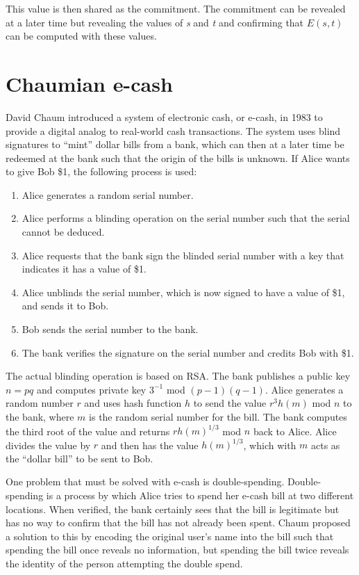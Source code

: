 \documentclass[11pt]{article}
\begin{document}
This value is then shared as the commitment. The commitment can be revealed at a later time but revealing the values of
\emph{s} and \emph{t} and confirming that $E(s,t)$ can be computed with these values.

\section{Chaumian e-cash}
David Chaum introduced a system of electronic cash, or e-cash, in 1983 to provide a digital analog to real-world cash
transactions. The system uses blind signatures to ``mint'' dollar bills from a bank, which can then at a later time be
redeemed at the bank such that the origin of the bills is unknown.\cite{chaum83} If Alice wants to give Bob \$1, the
following process is used:
\begin{enumerate}
    \item Alice generates a random serial number.
    \item Alice performs a blinding operation on the serial number such that the serial cannot be deduced.
    \item Alice requests that the bank sign the blinded serial number with a key that indicates it has a value of \$1.
    \item Alice unblinds the serial number, which is now signed to have a value of \$1, and sends it to Bob.
    \item Bob sends the serial number to the bank.
    \item The bank verifies the signature on the serial number and credits Bob with \$1.
\end{enumerate}

The actual blinding operation is based on RSA. The bank publishes a public key $n=pq$ and computes private key
$3^{-1}$ mod $(p-1)(q-1)$. Alice generates a random number $r$ and uses hash function $h$ to send the value
$r^3h(m)$ mod $n$ to the bank, where $m$ is the random serial number for the bill. The bank computes the third
root of the value and returns $rh(m)^{1/3}$ mod $n$ back to Alice. Alice divides the value by $r$ and then has
the value $h(m)^{1/3}$, which with $m$ acts as the ``dollar bill'' to be sent to Bob.

One problem that must be solved with e-cash is double-spending. Double-spending is a process by which Alice tries to
spend her e-cash bill at two different locations. When verified, the bank certainly sees that the bill is legitimate but
has no way to confirm that the bill has not already been spent. Chaum proposed a solution to this by encoding the
original user's name into the bill such that spending the bill once reveals no information, but spending the bill twice
reveals the identity of the person attempting the double spend.\cite{chaum1990}
\end{document}
